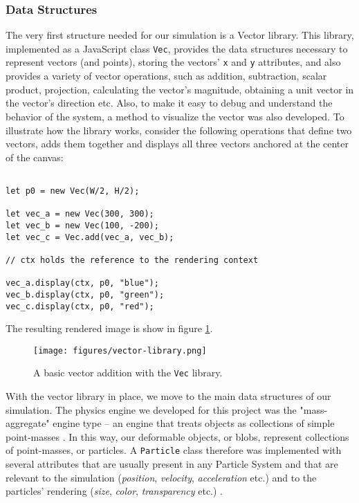 \documentclass[manuscript, screen]{timtm}
\begin{document}
\subsubsection{Data Structures}

The very first structure needed for our simulation is a Vector library. This library, implemented as a JavaScript class \texttt{Vec}, provides the data structures necessary to represent vectors (and points), storing the vectors' \texttt{x} and \texttt{y} attributes, and also provides a variety of vector operations, such as addition, subtraction, scalar product, projection, calculating the vector's magnitude, obtaining a unit vector in the vector's direction etc. Also, to make it easy to debug and understand the behavior of the system, a method to visualize the vector was also developed. To illustrate how the library works, consider the following operations that define two vectors, adds them together and displays all three vectors anchored at the center of the canvas:

\begin{verbatim}

let p0 = new Vec(W/2, H/2);

let vec_a = new Vec(300, 300);
let vec_b = new Vec(100, -200);
let vec_c = Vec.add(vec_a, vec_b);

// ctx holds the reference to the rendering context

vec_a.display(ctx, p0, "blue");
vec_b.display(ctx, p0, "green");
vec_c.display(ctx, p0, "red");

\end{verbatim}

The resulting rendered image is show in figure \ref{fig:vectors}.

\begin{figure}[h]
  \centering
  \texttt{[image: figures/vector-library.png]}
  \caption{A basic vector addition with the \texttt{Vec} library.}
  \label{fig:vectors}
\end{figure}

With the vector library in place, we move to the main data structures of our simulation. The physics engine we developed for this project was the "mass-aggregate" engine type -- an engine that treats objects as collections of simple point-masses \cite{game-physics-millington}. In this way, our deformable objects, or blobs, represent collections of point-masses, or particles. A \texttt{Particle} class therefore was implemented with several attributes that are usually present in any Particle System and that are relevant to the simulation (\textit{position}, \textit{velocity}, \textit{acceleration} etc.) and to the particles' rendering (\textit{size}, \textit{color}, \textit{transparency} etc.) \cite{particle-ReevesW.T.1983PSTf}.
\end{document}

